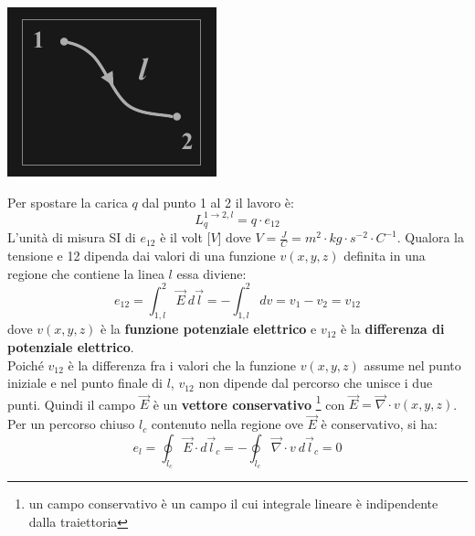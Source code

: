 \documentclass{article}
\begin{document}
\begin{center}
    \includegraphics[scale=0.5]{Image/Tensione.png}
\end{center}

Per spostare la carica $q$ dal punto 1 al 2 il lavoro è:
\[
    L^{1 \rightarrow 2,l}_q = q \cdot e_{12}
\]
L'unità di misura SI di $e_{12}$ è il volt [$V$] dove $V = \frac{J}{C} = m^2 \cdot kg \cdot s^{-2} \cdot C^{-1}$.
Qualora la tensione e 12 dipenda dai valori di una
funzione $v(x,y,z)$ definita in una regione che contiene la linea $l$ essa diviene:
\[
    e_{12} = \int_{1,l}^{2}\vec E \ d\vec l = - \int_{1,l}^{2} dv = v_1 - v_2 = v_{12}
\]
dove $v(x,y,z)$ è la \textbf{funzione potenziale elettrico} e $v_{12}$
è la \textbf{differenza di potenziale elettrico}.
\vspace*{0.1cm}\\
Poiché $v_{12}$ è la differenza fra i valori che la funzione $v(x,y,z)$ assume nel punto
iniziale e nel punto finale di $l$, $v_{12}$ non dipende dal percorso che unisce i due
punti. Quindi il campo $\vec E$ è un \textbf{vettore conservativo} \footnote{un campo conservativo è un campo il cui integrale lineare è indipendente dalla traiettoria} con $\vec E = \vec \nabla \cdot v(x,y,z)$.
\vspace*{0.1cm}\\
Per un percorso chiuso $l_c$ contenuto nella regione ove $\vec E$ è conservativo, si ha:
\[
    e_l = \oint _{l_c} \vec E \cdot d \vec l_c = - \oint _{l_c} \vec \nabla \cdot v  \ d\vec l_c = 0
\]
\end{document}
